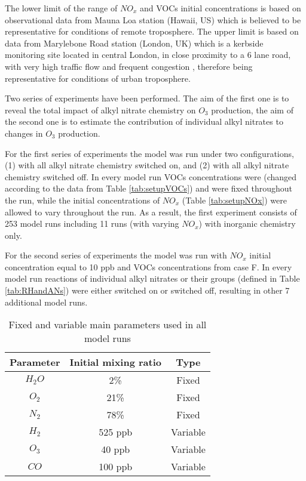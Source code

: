 \documentclass[11pt,a4paper]{article}
\begin{document}
The lower limit of the range of $NO_x$ and VOCs initial concentrations is based on observational data from Mauna Loa station (Hawaii, US) which is believed to be representative for conditions of remote troposphere. The upper limit is based on data from 
Marylebone Road station (London, UK) which is a kerbside monitoring site located in central London, in close proximity to a 6 lane road, with very high traffic flow and frequent congestion \citep{VonSchneidemesser2010}, therefore being representative for conditions of urban troposphere.

Two series of experiments have been performed. The aim of the first one is to reveal the total impact of alkyl nitrate chemistry on $O_3$ production, the aim of the second one is to estimate the contribution of individual alkyl nitrates to changes in $O_3$ production.

For the first series of experiments the model was run under two configurations, (1) with all alkyl nitrate chemistry switched on, and (2) with all alkyl nitrate chemistry switched off. In every model run VOCs concentrations were (changed according to the data from Table \ref{tab:setupVOCs}) and were fixed throughout the run, while the initial concentrations of $NO_x$ (Table \ref{tab:setupNOx}) were allowed to vary throughout the run. As a result, the first experiment consists of 253 model runs including 11 runs (with varying $NO_x$) with inorganic chemistry only.

For the second series of experiments the model was run with $NO_x$ initial concentration equal to 10 ppb and VOCs concentrations from case F. In every model run reactions of individual alkyl nitrates or their groups (defined in Table \ref{tab:RHandANs}) were either switched on or switched off, resulting in other 7 additional model runs.

\begin{table} %
\caption{Fixed and variable main parameters used in all model runs}
\label{tab:setupO3CO}
\centering
\begin{tabular}{ccc}
\hline
Parameter & Initial mixing ratio & Type \\
\hline
$H_2O$    & 2\%                  & Fixed    \\
$O_2$     & 21\%                 & Fixed    \\
$N_2$     & 78\%                 & Fixed    \\
$H_2$     & 525 ppb              & Variable \\
$O_3$     & 40 ppb               & Variable \\
$CO$      & 100 ppb              & Variable \\
\hline
\end{tabular}
\end{table}
\end{document}
